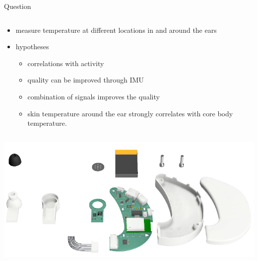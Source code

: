 \documentclass[en]{sdqbeamer}
\begin{document}

\begin{frame}[fragile]{Question}
    \begin{column}{0.50\textwidth}
        \begin{itemize}
            \item measure temperature at different locations in and around the ears
            \item hypotheses
            \begin{itemize}
                \item correlations with activity
                \item quality can be improved through IMU
                \item combination of signals improves the quality
                \item skin temperature around the ear strongly correlates with core body temperature.
            \end{itemize}
        \end{itemize}
    \end{column}
    \begin{column}{0.45\textwidth}
        \includegraphics[scale=0.26]{proposal-presentation/images/open_earable_new.png}
    \end{column}
\end{frame}
\end{document}
